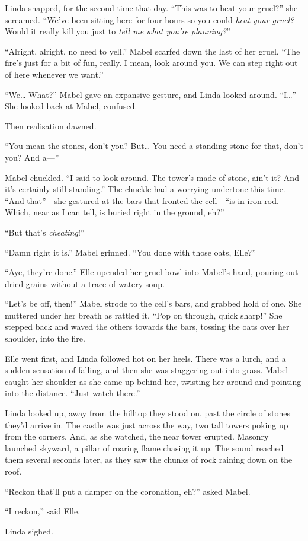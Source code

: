 Linda snapped, for the second time that day.
``This was to heat your gruel?'' she screamed.
``We've been sitting here for four hours so you could \emph{heat your gruel?}
Would it really kill you just to \emph{tell me what you're planning?}''

``Alright, alright, no need to yell.''
Mabel scarfed down the last of her gruel.
``The fire's just for a bit of fun, really.
I mean, look around you.
We can step right out of here whenever we want.''

``We{\dots}
What?''
Mabel gave an expansive gesture, and Linda looked around.
``I{\dots}''
She looked back at Mabel, confused.


Then realisation dawned.

``You mean the stones, don't you?
But{\dots}
You need a standing stone for that, don't you?
And a---''

Mabel chuckled.
``I said to look around.
The tower's made of stone, ain't it?
And it's certainly still standing.''
The chuckle had a worrying undertone this time.
``And that''---she gestured at the bars that fronted the cell---``is in iron rod.
Which, near as I can tell, is buried right in the ground, eh?''

``But that's \emph{cheating}!''

``Damn right it is.''
Mabel grinned.
``You done with those oats, Elle?''

``Aye, they're done.''
Elle upended her gruel bowl into Mabel's hand, pouring out dried grains without a trace of watery soup.

``Let's be off, then!''
Mabel strode to the cell's bars, and grabbed hold of one.
She muttered under her breath as rattled it.
``Pop on through, quick sharp!''
She stepped back and waved the others towards the bars, tossing the oats over her shoulder, into the fire.

Elle went first, and Linda followed hot on her heels.
There was a lurch, and a sudden sensation of falling, and then she was staggering out into grass.
Mabel caught her shoulder as she came up behind her, twisting her around and pointing into the distance.
``Just watch there.''

Linda looked up, away from the hilltop they stood on, past the circle of stones they'd arrive in.
The castle was just across the way, two tall towers poking up from the corners.
And, as she watched, the near tower erupted.
Masonry launched skyward, a pillar of roaring flame chasing it up.
The sound reached them several seconds later, as they saw the chunks of rock raining down on the roof.

``Reckon that'll put a damper on the coronation, eh?'' asked Mabel.

``I reckon,'' said Elle.

Linda sighed.
